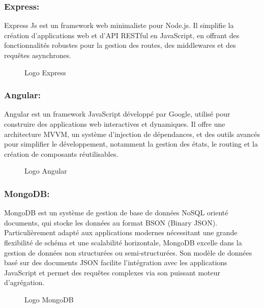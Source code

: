 \subsubsection*{Express:}
Express Js \cite{b8} est un framework web minimaliste pour Node.js. Il simplifie la création d'applications web et d'API RESTful en JavaScript, en offrant des fonctionnalités robustes pour la gestion des routes, des middlewares et des requêtes asynchrones.
\begin{figure}[H]
\centering
{}
\caption{Logo Express}
\end{figure}

\subsubsection*{Angular:}
Angular\cite{b10} est un framework JavaScript développé par Google, utilisé pour construire des applications web interactives et dynamiques. Il offre une architecture MVVM, un système d'injection de dépendances, et des outils avancés pour simplifier le développement, notamment la gestion des états, le routing et la création de composants réutilisables.
\begin{figure}[H]
\centering
{}
\caption{Logo Angular}
\end{figure}

\subsubsection*{MongoDB:}
MongoDB \cite{b9}est un système de gestion de base de données NoSQL orienté documents, qui stocke les données au format BSON (Binary JSON). Particulièrement adapté aux applications modernes nécessitant une grande flexibilité de schéma et une scalabilité horizontale, MongoDB excelle dans la gestion de données non structurées ou semi-structurées. Son modèle de données basé sur des documents JSON facilite l'intégration avec les applications JavaScript et permet des requêtes complexes via son puissant moteur d'agrégation.
\begin{figure}[H]
\centering
{}
\caption{Logo MongoDB}
\end{figure}

